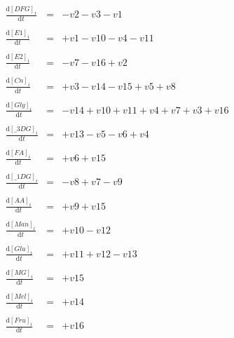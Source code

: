 \begin{eqnarray}
\frac{\mathrm{d}[DFG]_{i}}{\mathrm{d}t} & = & - v2- v3- v1 \\\nonumber & & \\
\frac{\mathrm{d}[E1]_{i}}{\mathrm{d}t} & = & + v1- v10- v4- v11 \\\nonumber & & \\
\frac{\mathrm{d}[E2]_{i}}{\mathrm{d}t} & = & - v7- v16+ v2 \\\nonumber & & \\
\frac{\mathrm{d}[Cn]_{i}}{\mathrm{d}t} & = & + v3- v14- v15+ v5+ v8 \\\nonumber & & \\
\frac{\mathrm{d}[Gly]_{i}}{\mathrm{d}t} & = & - v14+ v10+ v11+ v4+ v7+ v3+ v16 \\\nonumber & & \\
\frac{\mathrm{d}[\_3DG]_{i}}{\mathrm{d}t} & = & + v13- v5- v6+ v4 \\\nonumber & & \\
\frac{\mathrm{d}[FA]_{i}}{\mathrm{d}t} & = & + v6+ v15 \\\nonumber & & \\
\frac{\mathrm{d}[\_1DG]_{i}}{\mathrm{d}t} & = & - v8+ v7- v9 \\\nonumber & & \\
\frac{\mathrm{d}[AA]_{i}}{\mathrm{d}t} & = & + v9+ v15 \\\nonumber & & \\
\frac{\mathrm{d}[Man]_{i}}{\mathrm{d}t} & = & + v10- v12 \\\nonumber & & \\
\frac{\mathrm{d}[Glu]_{i}}{\mathrm{d}t} & = & + v11+ v12- v13 \\\nonumber & & \\
\frac{\mathrm{d}[MG]_{i}}{\mathrm{d}t} & = & + v15 \\\nonumber & & \\
\frac{\mathrm{d}[Mel]_{i}}{\mathrm{d}t} & = & + v14 \\\nonumber & & \\
\frac{\mathrm{d}[Fru]_{i}}{\mathrm{d}t} & = & + v16 \\\nonumber & & \\\nonumber
\end{eqnarray}
